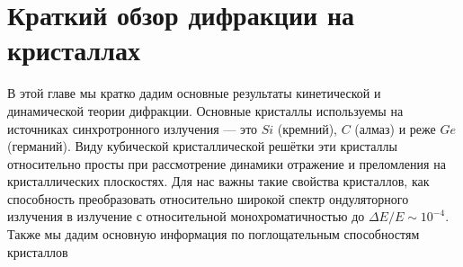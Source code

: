 \chapter{Краткий обзор дифракции на кристаллах}
В этой главе мы кратко дадим основные результаты кинетической и динамической теории дифракции. Основные кристаллы используемы на источниках синхротронного излучения --- это $Si$ (кремний), $C$ (алмаз) и реже $Ge$ (германий). Виду кубической кристаллической решётки эти кристаллы относительно просты при рассмотрение динамики отражение и преломления на кристаллических плоскостях. Для нас важны такие свойства кристаллов, как способность преобразовать относительно широкой спектр ондуляторного излучения в излучение с относительной монохроматичностью до $\Delta E/ E \sim 10^{-4}$. Также мы дадим основную информация по поглощательным способностям кристаллов
